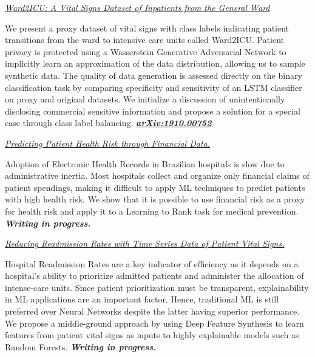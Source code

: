 \documentclass[margin, line]{res}
\begin{document}
\begin{resume}
\underline{\sl Ward2ICU: A Vital Signs Dataset of Inpatients from the General Ward}\\
\begin{small}
    We present a proxy dataset of vital signs with class labels indicating patient transitions from the ward to intensive care units called Ward2ICU. Patient privacy is protected using a Wasserstein Generative Adversarial Network to implicitly learn an approximation of the data distribution, allowing us to sample synthetic data. The quality of data generation is assessed directly on the binary classification task by comparing specificity and sensitivity of an LSTM classifier on proxy and original datasets. We initialize a discussion of unintentionally disclosing commercial sensitive information and propose a solution for a special case through class label balancing. \href{https://arxiv.org/abs/1910.00752}{\sl \textbf{arXiv:1910.00752}}
\end{small}

\underline{\sl Predicting Patient Health Risk through Financial Data.}\\
\begin{small}
    Adoption of Electronic Health Records in Brazilian hospitals is slow due to administrative inertia. Most hospitals collect and organize only financial claims of patient spendings, making it difficult to apply ML techniques to predict patients with high health risk. We show that it is possible to use financial risk as a proxy for health risk and apply it to a Learning to Rank task for medical prevention. {\sl \textbf{Writing in progress.}}
\end{small}

\underline{\sl Reducing Readmission Rates with Time Series Data of Patient Vital Signs.}\\
\begin{small}
    Hospital Readmission Rates are a key indicator of efficiency as it depends on a hospital's ability to prioritize admitted patients and administer the allocation of intense-care units. Since patient prioritization must be transparent, explainability in ML applications are an important factor. Hence, traditional ML is still preferred over Neural Networks despite the latter having superior performance. We propose a middle-ground approach by using Deep Feature Synthesis to learn features from patient vital signs as inputs to highly explainable models such as Random Forests. {\sl \textbf{Writing in progress.}}
\end{small}


\end{resume}
\end{document}
